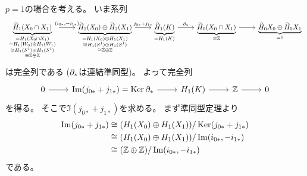 \documentclass[report]{jlreq}
\begin{document}
\begin{answer}
    $p = 1$の場合を考える。
    いま系列
    \begin{equation}
        \begin{tikzcd}
            \underbrace{\widetilde{H}_1(X_0 \cap X_1)}_{
                \substack{
                    = H_1(X_0 \cap X_1) \\
                    = H_1(W_0) \oplus H_1(W_1) \\
                    \cong H_1(S^1) \oplus H_1(S^1) \\
                    \cong \Z \oplus \Z
                }
            } \ar{r}{(i_{0*}, -i_{1*})}
                & \underbrace{\widetilde{H}_2(X_0) \oplus \widetilde{H}_2(X_1)}_{
                    \substack{
                        = H_1(X_0) \oplus H_1(X_1) \\
                        \cong H_1(S^1) \oplus H_1(S^1) \\
                        \cong \Z \oplus \Z
                    }
                } \ar{r}{j_{0*} + j_{1*}}
                & \underbrace{\widetilde{H}_1(K)}_{
                    = H_1(K)
                } \ar{r}{\del_*}
                & \underbrace{\widetilde{H}_0(X_0 \cap X_1)}_{
                    \substack{
                        \cong \Z
                    }
                } \ar{r}
                & \underbrace{\widetilde{H}_0{X_0} \oplus \widetilde{H}_0{X_1}}_{
                    \substack{
                        = 0
                    }
                }
        \end{tikzcd}
    \end{equation}
    は完全列である ($\partial_*$は連結準同型)。
    よって完全列
    \begin{equation}
        \begin{tikzcd}
            0 \ar{r}
                & \Im (j_{0*} + j_{1*}) = \Ker \del_* \ar{r}
                & H_1(K) \ar{r}
                & \Z \ar{r}
                & 0
        \end{tikzcd}
    \end{equation}
    を得る。
    そこで$\Im (j_{0*} + j_{1*})$を求める。
    まず準同型定理より
    \begin{alignat}{1}
        \operatorname{\mathrm{Im}} (j_{0*} + j_{1*})
            &\cong (H_1(X_0) \oplus H_1(X_1)) / \operatorname{\mathrm{Ker}} (j_{0*} + j_{1*}) \\
            &\cong (H_1(X_0) \oplus H_1(X_1)) / \operatorname{\mathrm{Im}} (i_{0*}, -i_{1*}) \\
            &\cong (\mathbb{Z} \oplus \mathbb{Z}) / \operatorname{\mathrm{Im}} (i_{0*}, -i_{1*})
    \end{alignat}
    である。

\end{answer}
\end{document}
